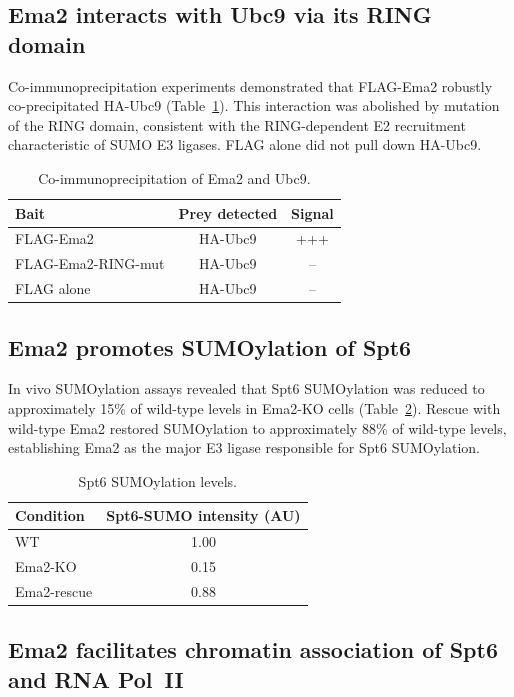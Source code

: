 \documentclass[11pt]{article}
\begin{document}
\subsection{Ema2 interacts with Ubc9 via its RING domain}

Co-immunoprecipitation experiments demonstrated that FLAG-Ema2 robustly co-precipitated HA-Ubc9 (Table~\ref{tab:coip}). This interaction was abolished by mutation of the RING domain, consistent with the RING-dependent E2 recruitment characteristic of SUMO E3 ligases. FLAG alone did not pull down HA-Ubc9.

\begin{table}[ht]
\centering
\caption{Co-immunoprecipitation of Ema2 and Ubc9.}
\label{tab:coip}
\begin{tabular}{lcc}
\toprule
\textbf{Bait} & \textbf{Prey detected} & \textbf{Signal} \\
\midrule
FLAG-Ema2 & HA-Ubc9 & +++ \\
FLAG-Ema2-RING-mut & HA-Ubc9 & -- \\
FLAG alone & HA-Ubc9 & -- \\
\bottomrule
\end{tabular}
\end{table}

\subsection{Ema2 promotes SUMOylation of Spt6}

In vivo SUMOylation assays revealed that Spt6 SUMOylation was reduced to approximately 15\% of wild-type levels in Ema2-KO cells (Table~\ref{tab:sumo}). Rescue with wild-type Ema2 restored SUMOylation to approximately 88\% of wild-type levels, establishing Ema2 as the major E3 ligase responsible for Spt6 SUMOylation.

\begin{table}[ht]
\centering
\caption{Spt6 SUMOylation levels.}
\label{tab:sumo}
\begin{tabular}{lc}
\toprule
\textbf{Condition} & \textbf{Spt6-SUMO intensity (AU)} \\
\midrule
WT & 1.00 \\
Ema2-KO & 0.15 \\
Ema2-rescue & 0.88 \\
\bottomrule
\end{tabular}
\end{table}

\subsection{Ema2 facilitates chromatin association of Spt6 and RNA Pol~II}
\end{document}
